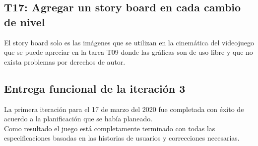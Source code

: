 \documentclass[a4paper, openright, 12pt]{report}
\begin{document}
\subsection*{T17: Agregar un story board en cada cambio de nivel}
\justify
El story board solo es las imágenes que se utilizan en la cinemática del videojuego que se puede apreciar en la tarea T09 donde las gráficas son de uso libre y que no exista problemas por derechos de autor.

\subsection*{Entrega funcional de la iteración 3}
\justify
La primera iteración para el 17 de marzo del 2020 fue completada con éxito de acuerdo a la planificación que se había planeado.\\
Como resultado el juego está completamente terminado con todas las especificaciones basadas en las historias de usuarios y correcciones necesarias.
\end{document}
